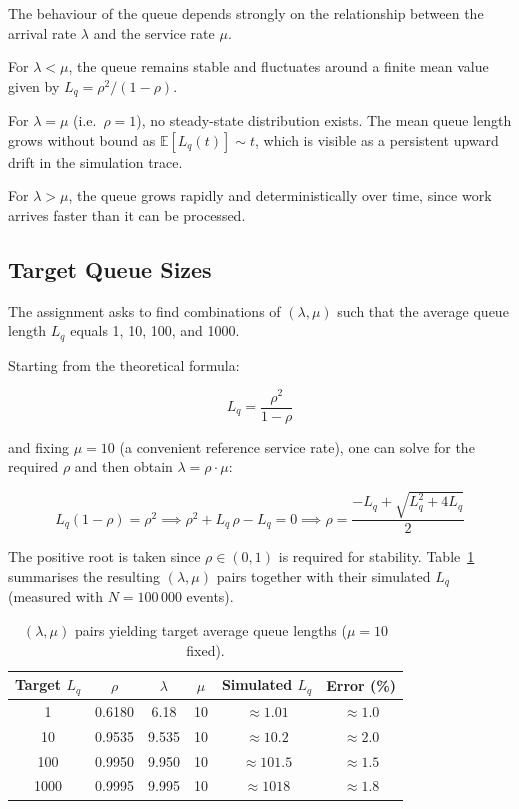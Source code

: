 \documentclass[12pt]{article}
\begin{document}
The behaviour of the queue depends strongly on the relationship between the arrival rate $\lambda$ and the service rate $\mu$.

For $\lambda < \mu$, the queue remains stable and fluctuates around a finite mean value given
by $L_q = \rho^2/(1-\rho)$.

For $\lambda = \mu$ (i.e.\ $\rho = 1$), no steady-state distribution exists. The mean queue
length grows without bound as $\mathbb{E}[L_q(t)] \sim t$, which is visible as a persistent
upward drift in the simulation trace.

For $\lambda > \mu$, the queue grows rapidly and deterministically over time, since work
arrives faster than it can be processed.

\subsection{Target Queue Sizes}

The assignment asks to find combinations of $(\lambda, \mu)$ such that the average queue
length $L_q$ equals 1, 10, 100, and 1000.

Starting from the theoretical formula:

\begin{equation}
L_q = \frac{\rho^2}{1-\rho}
\end{equation}

and fixing $\mu = 10$ (a convenient reference service rate), one can solve for the required
$\rho$ and then obtain $\lambda = \rho \cdot \mu$:

\begin{equation}
L_q (1 - \rho) = \rho^2
\implies
\rho^2 + L_q\,\rho - L_q = 0
\implies
\rho = \frac{-L_q + \sqrt{L_q^2 + 4L_q}}{2}
\end{equation}

The positive root is taken since $\rho \in (0,1)$ is required for stability.
Table~\ref{tab:target} summarises the resulting $(\lambda, \mu)$ pairs together with their
simulated $L_q$ (measured with $N=100\,000$ events).

\begin{table}[H]
\centering
\begin{tabular}{cccccc}
\toprule
Target $L_q$ & $\rho$ & $\lambda$ & $\mu$ & Simulated $L_q$ & Error (\%) \\
\midrule
1    & 0.6180 & 6.18  & 10 & $\approx 1.01$    & $\approx 1.0$ \\
10   & 0.9535 & 9.535 & 10 & $\approx 10.2$    & $\approx 2.0$ \\
100  & 0.9950 & 9.950 & 10 & $\approx 101.5$   & $\approx 1.5$ \\
1000 & 0.9995 & 9.995 & 10 & $\approx 1018$    & $\approx 1.8$ \\
\bottomrule
\end{tabular}
\caption{$(\lambda, \mu)$ pairs yielding target average queue lengths ($\mu=10$ fixed).}
\label{tab:target}
\end{table}
\end{document}
